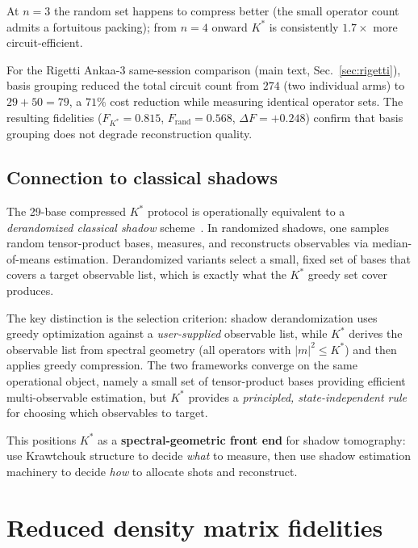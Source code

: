 \documentclass[twocolumn,prx,aps,superscriptaddress,longbibliography,floatfix]{revtex4-2}
\begin{document}
At $n = 3$ the random set happens to compress better (the small
operator count admits a fortuitous packing); from $n = 4$ onward
$K^*$ is consistently $1.7\times$ more circuit-efficient.

For the Rigetti Ankaa-3 same-session comparison (main text,
Sec.~\ref{sec:rigetti}), basis grouping reduced the total circuit count from
$274$ (two individual arms) to $29 + 50 = 79$, a $71\%$ cost
reduction while measuring identical operator sets.
The resulting fidelities ($F_{K^*} = 0.815$,
$F_{\mathrm{rand}} = 0.568$, $\Delta F = +0.248$) confirm that
basis grouping does not degrade reconstruction quality.

\subsection{Connection to classical shadows}
\label{sec:sm-shadows}

The 29-base compressed $K^*$ protocol is operationally equivalent
to a \emph{derandomized classical shadow} scheme~\cite{Huang2020,
Huang2021}.  In randomized shadows, one samples random
tensor-product bases, measures, and reconstructs observables via
median-of-means estimation.  Derandomized variants select a small,
fixed set of bases that covers a target observable list, which is exactly
what the $K^*$ greedy set cover produces.

The key distinction is the selection criterion: shadow
derandomization uses greedy optimization against a
\emph{user-supplied} observable list, while $K^*$ derives the
observable list from spectral geometry (all operators with
$|m|^2 \leq K^*$) and then applies greedy compression.  The two
frameworks converge on the same operational object, namely a small set of
tensor-product bases providing efficient multi-observable
estimation, but $K^*$ provides a \emph{principled,
state-independent rule} for choosing which observables to target.

This positions $K^*$ as a \textbf{spectral-geometric front end}
for shadow tomography: use Krawtchouk structure to decide
\emph{what} to measure, then use shadow estimation machinery to
decide \emph{how} to allocate shots and reconstruct.


\section{Reduced density matrix fidelities}
\label{sec:rdm}
\end{document}
